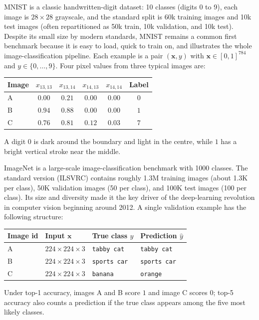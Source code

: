 \documentclass[a4paper, 12pt]{book}
\begin{document}
\begin{example}
    MNIST is a classic handwritten-digit dataset: 10 classes (digits 0 to 9), each image is $28\times28$ grayscale, and the standard split is 60k training images and 10k test images (often repartitioned as 50k train, 10k validation, and 10k test). Despite its small size by modern standards, MNIST remains a common first benchmark because it is easy to load, quick to train on, and illustrates the whole image-classification pipeline.
    Each example is a pair $(\mathbf{x},y)$ with $\mathbf{x}\in[0,1]^{784}$ and
    $y\in\{0,\ldots,9\}$. Four pixel values from three typical images are:
    \begin{center}
    \begin{tabular}{@{}lccccc@{}}
        \toprule
        Image & $x_{13,13}$ & $x_{13,14}$ & $x_{14,13}$ & $x_{14,14}$ & Label \\
        \midrule
        A & $0.00$ & $0.21$ & $0.00$ & $0.00$ & $0$ \\
        B & $0.94$ & $0.88$ & $0.00$ & $0.00$ & $1$ \\
        C & $0.76$ & $0.81$ & $0.12$ & $0.03$ & $7$ \\
        \bottomrule
    \end{tabular}
    \end{center}
    A digit $0$ is dark around the boundary and light in the centre, while $1$
    has a bright vertical stroke near the middle.
\end{example}

\begin{example}
    ImageNet is a large-scale image-classification benchmark with 1000 classes. The standard version (ILSVRC) contains roughly 1.3M training images (about 1.3K per class), 50K validation images (50 per class), and 100K test images (100 per class). Its size and diversity made it the key driver of the deep-learning revolution in computer vision beginning around 2012.
    A single validation example has the following structure:
    \begin{center}
    \begin{tabular}{@{}llll@{}}
        \toprule
        Image id & Input $\mathbf{x}$ & True class $y$ & Prediction $\hat y$ \\
        \midrule
        A & $224\times224\times3$ & \texttt{tabby\ cat} & \texttt{tabby\ cat} \\
        B & $224\times224\times3$ & \texttt{sports\ car} & \texttt{sports\ car} \\
        C & $224\times224\times3$ & \texttt{banana} & \texttt{orange} \\
        \bottomrule
    \end{tabular}
    \end{center}
    Under top-1 accuracy, images A and B score $1$ and image C scores $0$;
    top-5 accuracy also counts a prediction if the true class appears among the
    five most likely classes.
\end{example}
\end{document}
